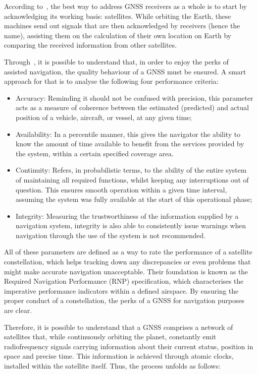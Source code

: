 According to~\cite{novatel_gnss,kaplan_2017}, the best way to address GNSS receivers as a whole is to start by acknowledging its working basis: satellites. While orbiting the Earth, these machines send out signals that are then acknowledged by receivers (hence the name), assisting them on the calculation of their own location on Earth by comparing the received information from other satellites.

Through~\cite{fed_rad_plan_2008}, it is possible to understand that, in order to enjoy the perks of assisted navigation, the quality behaviour of a GNSS must be ensured.
A smart approach for that is to analyse the following four performance criteria:

\begin{itemize}
    \item Accuracy: Reminding it should not be confused with precision, this parameter acts as a measure of coherence between the estimated (predicted) and actual position of a vehicle, aircraft, or vessel, at any given time;
    \item Availability: In a percentile manner, this gives the navigator the ability to know the amount of time available to benefit from the services provided by the system, within a certain specified coverage area.
    \item Continuity: Refers, in probabilistic terms, to the ability of the entire system of maintaining all required functions, whilst keeping any interruptions out of question. This ensures smooth operation within a given time interval, assuming the system was fully available at the start of this operational phase;
    \item Integrity: Measuring the trustworthiness of the information supplied by a navigation system, integrity is also able to consistently issue warnings when navigation through the use of the system is not recommended.
\end{itemize}
All of these parameters are defined as a way to rate the performance of a satellite constellation, which helps tracking down any discrepancies or even problems that might make accurate navigation unacceptable.
Their foundation is known as the Required Navigation Performance (RNP) specification, which characterises the imperative performance indicators within a defined airspace. By ensuring the proper conduct of a constellation, the perks of a GNSS for navigation purposes are clear.

Therefore, it is possible to understand that a GNSS comprises a network of satellites that, while continuously orbiting the planet, constantly emit radiofrequency signals carrying information about their current status, position in space and precise time.
This information is achieved through atomic clocks, installed within the satellite itself. Thus, the process unfolds as follows:

